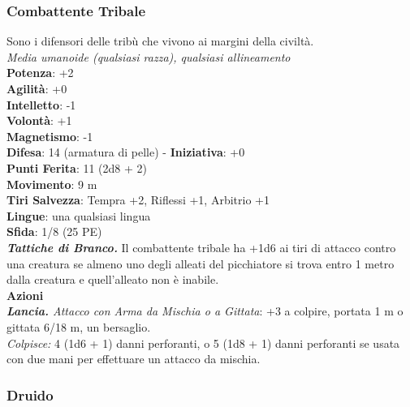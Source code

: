\begin{multicols}{2}
\subsubsection{Combattente Tribale}
Sono i difensori delle tribù che vivono ai margini della civiltà.\\
\emph{Media umanoide (qualsiasi razza), qualsiasi allineamento}\\
\textbf{Potenza}: +2\\
\textbf{Agilità}: +0\\
\textbf{Intelletto}: -1\\
\textbf{Volontà}: +1\\
\textbf{Magnetismo}: -1\\
\textbf{Difesa}: 14 (armatura di pelle) - \textbf{Iniziativa}: +0\\
\textbf{Punti Ferita}: 11 (2d8 + 2)\\
\textbf{Movimento}: 9 m\\
\textbf{Tiri Salvezza}: Tempra +2, Riflessi +1, Arbitrio +1 \\
\textbf{Lingue}: una qualsiasi lingua\\
\textbf{Sfida}: 1/8 (25 PE)\smallskip\\
\emph{\textbf{Tattiche di Branco.}} Il combattente tribale ha +1d6 ai tiri di attacco contro una creatura se almeno uno degli alleati del picchiatore si trova entro 1 metro dalla creatura e quell'alleato non è inabile.\\
\smallskip\textbf{Azioni}\\
\emph{\textbf{Lancia.} Attacco con Arma da Mischia o a Gittata}: +3 a colpire, portata 1 m o gittata 6/18 m, un bersaglio.\\
\emph{Colpisce:} 4 (1d6 + 1) danni perforanti, o 5 (1d8 + 1) danni perforanti se usata con due mani per effettuare un attacco da mischia.\\

\subsubsection{Druido}


\end{multicols}
